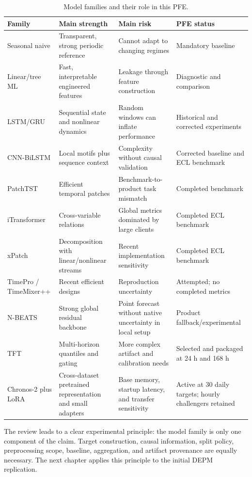 \begin{table}[H]
\centering
\caption{Model families and their role in this PFE.}
\label{tab:families}
\begin{tabularx}{\textwidth}{p{}p{}YY}
\toprule
Family & Main strength & Main risk & PFE status \\
\midrule
Seasonal naive & Transparent, strong periodic reference & Cannot adapt to changing regimes & Mandatory baseline \\
Linear/tree ML & Fast, interpretable engineered features & Leakage through feature construction & Diagnostic and comparison \\
LSTM/GRU & Sequential state and nonlinear dynamics & Random windows can inflate performance & Historical and corrected experiments \\
CNN-BiLSTM & Local motifs plus sequence context & Complexity without causal validation & Corrected baseline and ECL benchmark \\
PatchTST & Efficient temporal patches & Benchmark-to-product task mismatch & Completed benchmark \\
iTransformer & Cross-variable relations & Global metrics dominated by large clients & Completed ECL benchmark \\
xPatch & Decomposition with linear/nonlinear streams & Recent implementation sensitivity & Completed ECL benchmark \\
TimePro / TimeMixer++ & Recent efficient designs & Reproduction uncertainty & Attempted; no completed metrics \\
N-BEATS & Strong global residual backbone & Point forecast without native uncertainty in local setup & Product fallback/experimental \\
TFT & Multi-horizon quantiles and gating & More complex artifact and calibration needs & Selected and packaged at 24 h and 168 h \\
Chronos-2 plus LoRA & Cross-dataset pretrained representation and small adapters & Base memory, startup latency, and transfer sensitivity & Active at 30 daily targets; hourly challengers retained \\
\bottomrule
\end{tabularx}
\end{table}

The review leads to a clear experimental principle: the model family is only one component of the claim. Target construction, causal information, split policy, preprocessing scope, baseline, aggregation, and artifact provenance are equally necessary. The next chapter applies this principle to the initial DEPM replication.
